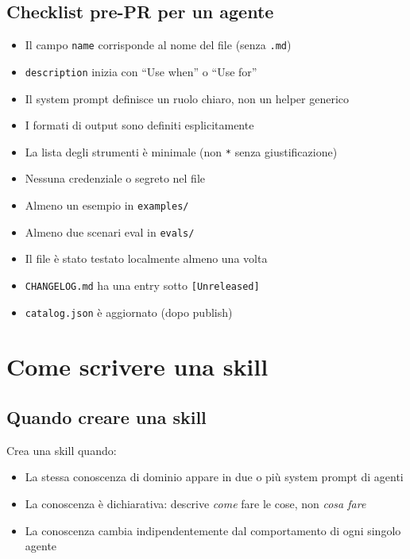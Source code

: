 \documentclass[12pt,a4paper,twoside]{book}
\begin{document}
\section{Checklist pre-PR per un agente}

\begin{itemize}[label=$\square$]
  \item Il campo \texttt{name} corrisponde al nome del file (senza \texttt{.md})
  \item \texttt{description} inizia con ``Use when'' o ``Use for''
  \item Il system prompt definisce un ruolo chiaro, non un helper generico
  \item I formati di output sono definiti esplicitamente
  \item La lista degli strumenti è minimale (non \texttt{*} senza giustificazione)
  \item Nessuna credenziale o segreto nel file
  \item Almeno un esempio in \texttt{examples/}
  \item Almeno due scenari eval in \texttt{evals/}
  \item Il file è stato testato localmente almeno una volta
  \item \texttt{CHANGELOG.md} ha una entry sotto \texttt{[Unreleased]}
  \item \texttt{catalog.json} è aggiornato (dopo publish)
\end{itemize}

\chapter{Come scrivere una skill}

\section{Quando creare una skill}

Crea una skill quando:
\begin{itemize}
  \item La stessa conoscenza di dominio appare in due o più system prompt di agenti
  \item La conoscenza è dichiarativa: descrive \textit{come} fare le cose, non \textit{cosa fare}
  \item La conoscenza cambia indipendentemente dal comportamento di ogni singolo agente
\end{itemize}
\end{document}

